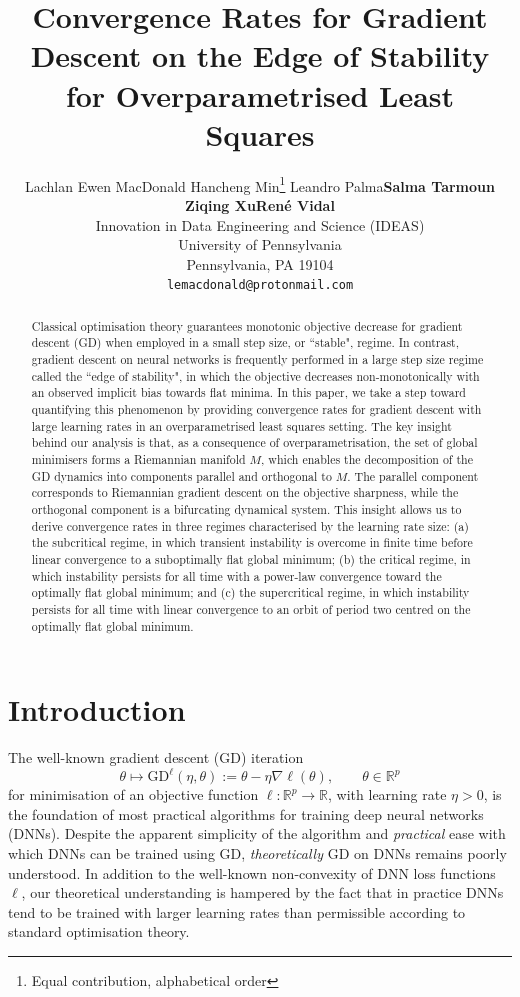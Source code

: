 \documentclass{article}
\title{Convergence Rates for Gradient Descent on the Edge of Stability for Overparametrised Least Squares}
\author{%
  Lachlan Ewen MacDonald \quad Hancheng Min\thanks{Equal contribution, alphabetical order} \quad Leandro Palma\footnotemark[1] \quad \textbf{Salma Tarmoun}\footnotemark[1] \\ \textbf{Ziqing Xu}\footnotemark[1] \quad \textbf{Ren\'{e} Vidal} \\
  Innovation in Data Engineering and Science (IDEAS)\\
  University of Pennsylvania\\
  Pennsylvania, PA 19104 \\
  \texttt{lemacdonald@protonmail.com} \\
}
\newcommand{\RB}{\mathbb{R}}
\newcommand{\GD}{\mathrm{GD}}
\theoremstyle{plain}
\theoremstyle{definition}
\theoremstyle{remark}
\begin{document}
\maketitle


\begin{abstract}  
    Classical optimisation theory guarantees monotonic objective decrease for gradient descent (GD) when employed in a small step size, or ``stable", regime. In contrast, gradient descent on neural networks is frequently performed in a large step size regime called the ``edge of stability", in which the objective decreases non-monotonically with an observed implicit bias towards flat minima. In this paper, we take a step toward quantifying this phenomenon by providing convergence rates for gradient descent with large learning rates in an overparametrised least squares setting. The key insight behind our analysis is that, as a consequence of overparametrisation, the set of global minimisers forms a Riemannian manifold $M$, which enables the decomposition of the GD dynamics into components parallel and orthogonal to $M$. The parallel component corresponds to Riemannian gradient descent on the objective sharpness, while the orthogonal component is a bifurcating dynamical system. This insight allows us to derive convergence rates in three regimes characterised by the learning rate size: (a) the subcritical regime, in which transient instability is overcome in finite time before linear convergence to a suboptimally flat global minimum; (b) the critical regime, in which instability persists for all time with a power-law convergence toward the optimally flat global minimum; and (c) the supercritical regime, in which instability persists for all time with linear convergence to an orbit of period two centred on the optimally flat global minimum.
\end{abstract}

\section{Introduction}

The well-known gradient descent (GD) iteration
\begin{equation}
    \theta\mapsto \GD^{\ell}(\eta,\theta):=\theta-\eta\nabla\ell(\theta),\qquad \theta\in\RB^p
\end{equation}
for minimisation of an objective function $\ell:\RB^p\rightarrow\RB$, with learning rate $\eta>0$, is the foundation of most practical algorithms for training deep neural networks (DNNs). Despite the apparent simplicity of the algorithm and \emph{practical} ease with which DNNs can be trained using GD, \emph{theoretically} GD on DNNs remains poorly understood. In addition to the well-known non-convexity of DNN loss functions $\ell$, our theoretical understanding is hampered by the fact that in practice DNNs tend to be trained with larger learning rates than permissible according to standard optimisation theory.
\end{document}
